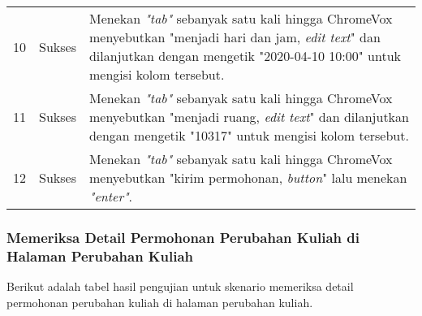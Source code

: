 \begin{table}[H]
\begin{tabular}{|c|c|p{10cm}|}
        10 & Sukses & Menekan \textit{"tab"} sebanyak satu kali hingga ChromeVox menyebutkan "menjadi hari dan jam, \textit{edit text}" dan dilanjutkan dengan mengetik "2020-04-10 10:00" untuk mengisi kolom tersebut. \\
        11 & Sukses & Menekan \textit{"tab"} sebanyak satu kali hingga ChromeVox menyebutkan "menjadi ruang, \textit{edit text}" dan dilanjutkan dengan mengetik "10317" untuk mengisi kolom tersebut. \\
        12 & Sukses & Menekan \textit{"tab"} sebanyak satu kali hingga ChromeVox menyebutkan "kirim permohonan, \textit{button}" lalu menekan \textit{"enter"}. \\

        \bottomrule

    \end{tabular}
\end{table}

\subsubsection{Memeriksa Detail Permohonan Perubahan Kuliah di Halaman Perubahan Kuliah}
\label{subsubsec:hasil_pengujian_memeriksa_detail_permohonan_perubahan_kuliah_di_halaman_perubahan_kuliah}
Berikut adalah tabel hasil pengujian untuk skenario memeriksa detail permohonan perubahan kuliah di halaman perubahan kuliah.

